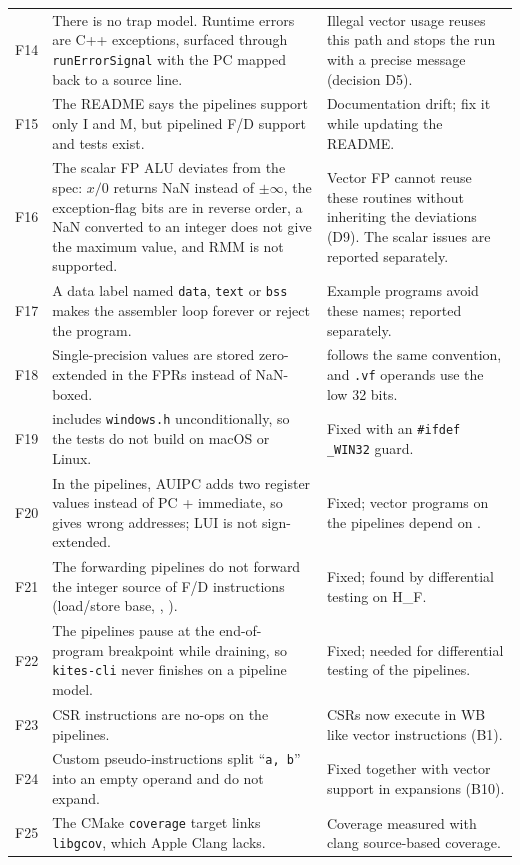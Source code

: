 \documentclass[11pt]{article}
\begin{document}
\begin{longtable}{@{}L{0.8cm}L{7.3cm}L{7.0cm}@{}}
F14 & There is no trap model. Runtime errors are C++ exceptions, surfaced through \texttt{runErrorSignal} with the PC mapped back to a source line. & Illegal vector usage reuses this path and stops the run with a precise message (decision D5). \\
F15 & The README says the pipelines support only I and M, but pipelined F/D support and tests exist. & Documentation drift; fix it while updating the README. \\
F16 & The scalar FP ALU deviates from the spec: $x/0$ returns NaN instead of $\pm\infty$, the exception-flag bits are in reverse order, a NaN converted to an integer does not give the maximum value, and RMM is not supported. & Vector FP cannot reuse these routines without inheriting the deviations (D9). The scalar issues are reported separately. \\
F17 & A data label named \texttt{data}, \texttt{text} or \texttt{bss} makes the assembler loop forever or reject the program. & Example programs avoid these names; reported separately. \\
F18 & Single-precision values are stored zero-extended in the FPRs instead of NaN-boxed. &  follows the same convention, and \texttt{.vf} operands use the low 32 bits. \\
F19 &  includes \texttt{windows.h} unconditionally, so the tests do not build on macOS or Linux. & Fixed with an \texttt{\#ifdef \_WIN32} guard. \\
F20 & In the pipelines, AUIPC adds two register values instead of PC + immediate, so  gives wrong addresses; LUI is not sign-extended. & Fixed; vector programs on the pipelines depend on . \\
F21 & The forwarding pipelines do not forward the integer source of F/D instructions (load/store base, , ). & Fixed; found by differential testing on H\_F. \\
F22 & The pipelines pause at the end-of-program breakpoint while draining, so \texttt{kites-cli} never finishes on a pipeline model. & Fixed; needed for differential testing of the pipelines. \\
F23 & CSR instructions are no-ops on the pipelines. & CSRs now execute in WB like vector instructions (B1). \\
F24 & Custom pseudo-instructions split ``\texttt{a, b}'' into an empty operand and do not expand. & Fixed together with vector support in expansions (B10). \\
F25 & The CMake \texttt{coverage} target links \texttt{libgcov}, which Apple Clang lacks. & Coverage measured with clang source-based coverage. \\
\bottomrule
\end{longtable}
\normalsize
\end{document}
